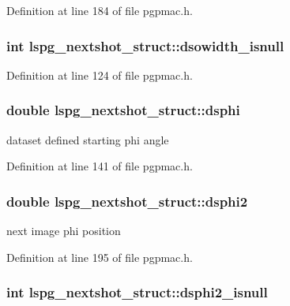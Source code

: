 Definition at line 184 of file pgpmac.h.\hypertarget{structlspg__nextshot__struct_a5dd3db64790e09bc03499e521bbaa126}{
\subsubsection[{dsowidth\_\-isnull}]{\setlength{\rightskip}{0pt plus 5cm}int {\bf lspg\_\-nextshot\_\-struct::dsowidth\_\-isnull}}}
\label{structlspg__nextshot__struct_a5dd3db64790e09bc03499e521bbaa126}


Definition at line 124 of file pgpmac.h.\hypertarget{structlspg__nextshot__struct_a64ebde597ca97a3b98145dc2d580c64f}{
\subsubsection[{dsphi}]{\setlength{\rightskip}{0pt plus 5cm}double {\bf lspg\_\-nextshot\_\-struct::dsphi}}}
\label{structlspg__nextshot__struct_a64ebde597ca97a3b98145dc2d580c64f}


dataset defined starting phi angle 

Definition at line 141 of file pgpmac.h.\hypertarget{structlspg__nextshot__struct_a98857616b6bbb6ba861e96b6b7551756}{
\subsubsection[{dsphi2}]{\setlength{\rightskip}{0pt plus 5cm}double {\bf lspg\_\-nextshot\_\-struct::dsphi2}}}
\label{structlspg__nextshot__struct_a98857616b6bbb6ba861e96b6b7551756}


next image phi position 

Definition at line 195 of file pgpmac.h.\hypertarget{structlspg__nextshot__struct_a57a9c43be86188f65b96d59c2adec674}{
\subsubsection[{dsphi2\_\-isnull}]{\setlength{\rightskip}{0pt plus 5cm}int {\bf lspg\_\-nextshot\_\-struct::dsphi2\_\-isnull}}}
\label{structlspg__nextshot__struct_a57a9c43be86188f65b96d59c2adec674}


